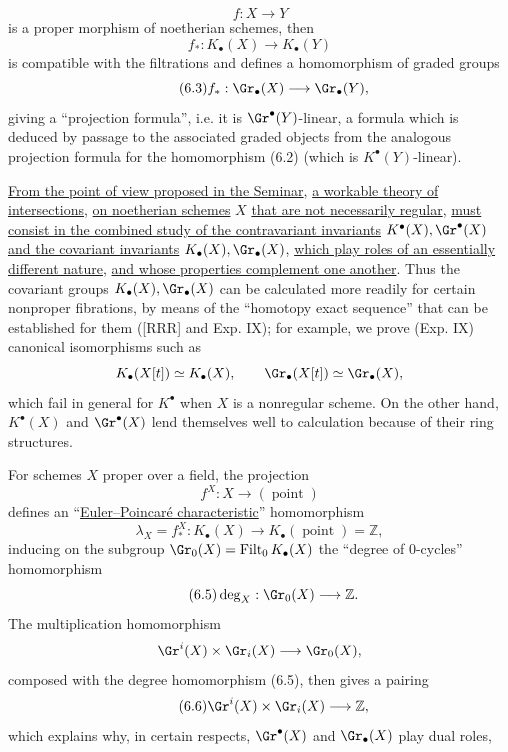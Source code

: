 \[
f:X\longrightarrow Y
\]
is a proper morphism of noetherian schemes, then
\begin{equation}\tag{6.2}
f_*:K_\bullet(X)\longrightarrow K_\bullet(Y)
\end{equation}
is compatible with the filtrations and defines a homomorphism of graded groups
\begin{equation}\tag{6.3}
f_*:\Gr_\bullet(X)\longrightarrow \Gr_\bullet(Y),
\end{equation}
giving a ``projection formula'', i.e. it is $\Gr^\bullet(Y)$-linear, a formula which is deduced by passage to the associated graded objects from the analogous projection formula for the homomorphism (6.2) (which is $K^\bullet(Y)$-linear).

\uline{From the point of view proposed in the Seminar}, \uline{a workable theory of intersections}, \uline{on noetherian schemes} $X$ \uline{that are not necessarily regular}, \uline{must consist in the combined study of the contravariant invariants} $K^\bullet(X),\Gr^\bullet(X)$ \uline{and the covariant invariants} $K_\bullet(X),\Gr_\bullet(X)$, \uline{which play roles of an essentially different nature}, \uline{and whose properties complement one another}. Thus the covariant groups $K_\bullet(X),\Gr_\bullet(X)$ can be calculated more readily for certain nonproper fibrations, by means of the ``homotopy exact sequence'' that can be established for them ([RRR] and Exp. IX); for example, we prove (Exp. IX) canonical isomorphisms such as
\[
K_\bullet(X[t])\simeq K_\bullet(X),\qquad \Gr_\bullet(X[t])\simeq \Gr_\bullet(X),
\]
which fail in general for $K^\bullet$ when $X$ is a nonregular scheme. On the other hand, $K^\bullet(X)$ and $\Gr^\bullet(X)$ lend themselves well to calculation because of their ring structures.

For schemes $X$ proper over a field, the projection
\[
f^X:X\longrightarrow(\operatorname{point})
\]
defines an ``\uline{Euler--Poincaré characteristic}'' homomorphism
\begin{equation}\tag{6.4}
\lambda_X=f^X_*:K_\bullet(X)\longrightarrow K_\bullet(\operatorname{point})=\mathbb Z,
\end{equation}
inducing on the subgroup $\Gr_0(X)=\operatorname{Filt}_0K_\bullet(X)$ the ``degree of $0$-cycles'' homomorphism
\begin{equation}\tag{6.5}
\deg_X:\Gr_0(X)\longrightarrow \mathbb Z.
\end{equation}
The multiplication homomorphism
\[
\Gr^i(X)\times\Gr_i(X)\longrightarrow \Gr_0(X),
\]
composed with the degree homomorphism (6.5), then gives a pairing
\begin{equation}\tag{6.6}
\Gr^i(X)\times \Gr_i(X)\longrightarrow \mathbb Z,
\end{equation}
which explains why, in certain respects, $\Gr^\bullet(X)$ and $\Gr_\bullet(X)$ play dual roles,

